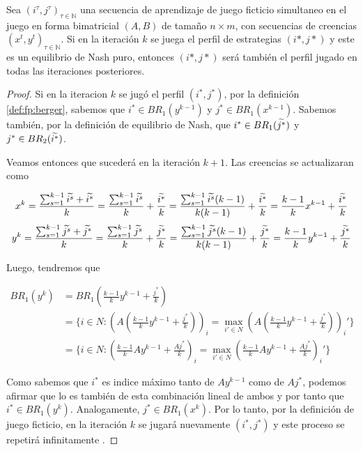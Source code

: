 \begin{theorem}
    Sea $(i^\tau, j^\tau)_{\tau \in \mathbb{N}}$ una secuencia de aprendizaje de juego ficticio simultaneo en el juego en forma bimatricial $(A, B)$ de tamaño $n \times m$, con secuencias de creencias $(x^t, y^t)_{\tau \in \mathbb{N}}$. Si en la iteración $k$ se juega el perfil de estrategias $(i*, j*)$ y este es un equilibrio de Nash puro, entonces $(i*, j*)$ será también el perfil jugado en todas las iteraciones posteriores.
\end{theorem}

\begin{proof}
    Si en la iteracion $k$ se jugó el perfil $(i^*, j^*)$, por la definición \ref{def:fp:berger}, sabemos que $i^* \in BR_1(y^{k-1})$ y $j^* \in BR_1(x^{k-1})$. Sabemos también, por la definición de equilibrio de Nash, que $i^* \in BR_1(\widetilde{j^*})$ y $j^* \in BR_2(\widetilde{i^*})$.

    Veamos entonces que sucederá en la iteración $k+1$. Las creencias se actualizaran como

    \[
        x^k = \frac{\sum_{s=1}^{k-1}{\widetilde{i^s}} + \widetilde{i^*}}{k}
            = \frac{\sum_{s=1}^{k-1}{\widetilde{i^s}}}{k} + \frac{\widetilde{i^*}}{k}
            = \frac{\sum_{s=1}^{k-1}{\widetilde{i^s}}(k-1)}{k(k-1)} + \frac{\widetilde{i^*}}{k}
            = \frac{k - 1}{k} x^{k-1} + \frac{\widetilde{i^*}}{k}
    \]
    \[
        y^k = \frac{\sum_{s=1}^{k-1}{\widetilde{j^s}} + \widetilde{j^*}}{k}
            = \frac{\sum_{s=1}^{k-1}{\widetilde{j^s}}}{k} + \frac{\widetilde{j^*}}{k}
            = \frac{\sum_{s=1}^{k-1}{\widetilde{j^s}}(k-1)}{k(k-1)} + \frac{\widetilde{j^*}}{k}
            = \frac{k - 1}{k} y^{k-1} + \frac{\widetilde{j^*}}{k}
    \]

    Luego, tendremos que

    \begin{align*}
        BR_1(y^k) &= BR_1(\frac{k - 1}{k} y^{k-1} + \frac{j^*}{k}) \\
        &= \{i \in N : (A(\frac{k - 1}{k} y^{k-1} + \frac{j^*}{k}))_i = \max_{i' \in N} (A(\frac{k - 1}{k} y^{k-1} + \frac{j^*}{k}))_i'\}\\
        &= \{i \in N : (\frac{k - 1}{k} Ay^{k-1} + \frac{Aj^*}{k})_i = \max_{i' \in N} (\frac{k - 1}{k} Ay^{k-1} + \frac{Aj^*}{k})_i'\}
    \end{align*}

    Como sabemos que $i^*$ es indice máximo tanto de $Ay^{k-1}$ como de $Aj^*$, podemos afirmar que lo es también de esta combinación lineal de ambos  y por tanto que $i^* \in BR_1(y^k)$. Analogamente, $j^* \in BR_1(x^k)$. Por lo tanto, por la definición de juego ficticio, en la iteración $k$ se jugará nuevamente $(i^*, j^*)$ y este proceso se repetirá infinitamente .

\end{proof}

